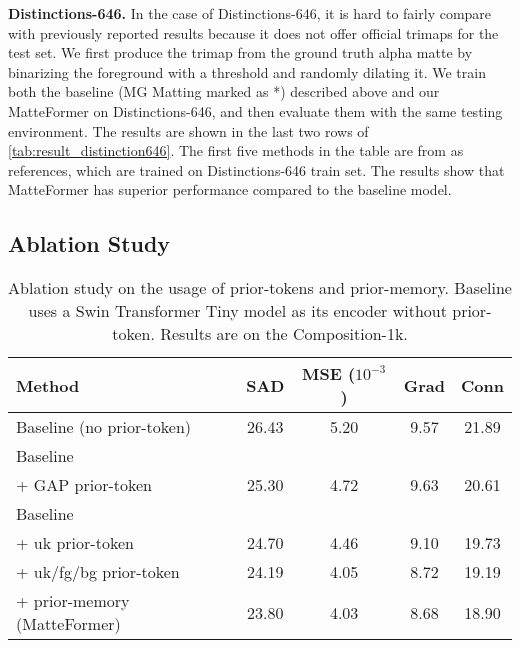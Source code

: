 \documentclass[10pt,twocolumn,letterpaper]{article}
\begin{document}
\textbf{Distinctions-646.}
In the case of Distinctions-646, it is hard to fairly compare with previously reported results because it does not offer official trimaps for the test set.
We first produce the trimap from the ground truth alpha matte by binarizing the foreground with a threshold and randomly dilating it.
We train both the baseline (MG Matting marked as *) described above and our MatteFormer on Distinctions-646, and then evaluate them with the same testing environment. The results are shown in the last two rows of \cref{tab:result_distinction646}.
The first five methods in the table are from\cite{qiao2020attention} as references, which are trained on Distinctions-646 train set.
The results show that MatteFormer has superior performance compared to the baseline model.

\subsection{Ablation Study}



\begin{table}[t!]
  \centering
   \begin{adjustbox}{width = \linewidth}
  \begin{tabular}{l | c c c c}
    \toprule
    Method & SAD & \makecell{MSE \\ ($10^{-3}$)} & Grad & Conn\\
    \midrule
    Baseline (no prior-token) & 26.43 & 5.20 & 9.57 & 21.89 \\
    \hline
    Baseline & & & & \\
    + GAP prior-token  & 25.30 & 4.72 & 9.63 & 20.61 \\
    \hline
    Baseline & & & & \\
    + uk prior-token  & 24.70 & 4.46 & 9.10 & 19.73 \\
    + uk/fg/bg prior-token & 24.19 & 4.05 & 8.72 & 19.19 \\
    + prior-memory (MatteFormer) & 23.80 & 4.03 & 8.68 & 18.90 \\
    \bottomrule
  \end{tabular}
  \end{adjustbox}
  \caption{Ablation study on the usage of prior-tokens and prior-memory. Baseline uses a Swin Transformer Tiny model as its encoder without prior-token. Results are on the Composition-1k.}
  \label{tab:ablation}
  \vspace{-2mm}
\end{table}
\end{document}
